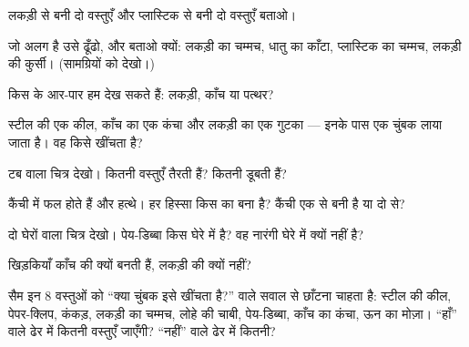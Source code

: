 \begin{exercise}[$\star$]\label{exo:g1:materials-around-us:3}
लकड़ी से बनी दो वस्तुएँ और प्लास्टिक से बनी दो वस्तुएँ बताओ।
\end{exercise}

\begin{exercise}[$\star$]\label{exo:g1:materials-around-us:4}
जो अलग है उसे ढूँढो, और बताओ क्यों: लकड़ी का चम्मच, धातु का काँटा,
प्लास्टिक का चम्मच, लकड़ी की कुर्सी। (सामग्रियों को देखो।)
\end{exercise}

\begin{exercise}[$\star$]\label{exo:g1:materials-around-us:5}
किस  के आर-पार हम देख सकते हैं: लकड़ी, काँच या पत्थर?
\end{exercise}

\begin{exercise}[$\star$]\label{exo:g1:materials-around-us:6}
स्टील की एक कील, काँच का एक कंचा और लकड़ी का एक गुटका --- इनके पास
एक चुंबक लाया जाता है। वह किसे खींचता है?
\end{exercise}

\begin{exercise}[$\star$]\label{exo:g1:materials-around-us:7}
टब वाला चित्र देखो। कितनी वस्तुएँ तैरती हैं? कितनी
डूबती हैं?
\end{exercise}

\begin{exercise}[$\star$]\label{exo:g1:materials-around-us:8}
कैंची में फल होते हैं और हत्थे। हर हिस्सा किस  का बना है?
कैंची एक  से बनी है या दो से?
\end{exercise}

\begin{exercise}[$\star$]\label{exo:g1:materials-around-us:9}
दो घेरों वाला चित्र देखो। पेय-डिब्बा किस घेरे में है? वह नारंगी
घेरे में क्यों नहीं है?
\end{exercise}

\begin{exercise}[$\star\star$]\label{exo:g1:materials-around-us:10}
खिड़कियाँ काँच की क्यों बनती हैं, लकड़ी की क्यों नहीं?
\end{exercise}

\begin{exercise}[$\star\star$]\label{exo:g1:materials-around-us:11}
सैम इन 8 वस्तुओं को ``क्या चुंबक इसे खींचता है?'' वाले सवाल से छाँटना
चाहता है: स्टील की कील, पेपर-क्लिप, कंकड़, लकड़ी का चम्मच, लोहे की
चाबी, पेय-डिब्बा, काँच का कंचा, ऊन का मोज़ा। ``हाँ'' वाले ढेर में कितनी
वस्तुएँ जाएँगी? ``नहीं'' वाले ढेर में कितनी?
\end{exercise}

